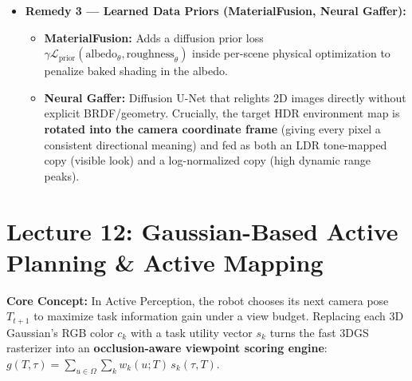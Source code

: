 \documentclass[11pt,a4paper]{article}
\theoremstyle{definition}
\theoremstyle{plain}
\theoremstyle{remark}
\begin{document}
\begin{itemize}
    \begin{itemize}
        \item \textbf{Linearity of Light Transport:} Photons do not interact, so $I(c_A A + c_B B) = c_A I_A + c_B I_B$ (in linear HDR space). Capturing \textbf{One Light at a Time (OLAT)} images $I_k$ builds the light-transport matrix $T = [I_1 \mid \cdots \mid I_K]$; relighting under any new environment $\ell$ is a simple weighted sum $I_{\text{new}} = \sum_k \ell_k I_k$ with \textbf{zero BRDF or geometry estimation} (requires a static subject in a light stage).
    \end{itemize}
    \item \textbf{Remedy 3 --- Learned Data Priors (MaterialFusion, Neural Gaffer):}
    \begin{itemize}
        \item \textbf{MaterialFusion:} Adds a diffusion prior loss $\gamma\mathcal{L}_{\text{prior}}(\text{albedo}_\theta, \text{roughness}_\theta)$ inside per-scene physical optimization to penalize baked shading in the albedo.
        \item \textbf{Neural Gaffer:} Diffusion U-Net that relights 2D images directly without explicit BRDF/geometry. Crucially, the target HDR environment map is \textbf{rotated into the camera coordinate frame} (giving every pixel a consistent directional meaning) and fed as both an LDR tone-mapped copy (visible look) and a log-normalized copy (high dynamic range peaks).
    \end{itemize}
\end{itemize}

\hr
\section*{\textcolor{primary}{Lecture 12: Gaussian-Based Active Planning \& Active Mapping}}
\textbf{Core Concept:} In Active Perception, the robot chooses its next camera pose $T_{t+1}$ to maximize task information gain under a view budget. Replacing each 3D Gaussian's RGB color $c_k$ with a task utility vector $s_k$ turns the fast 3DGS rasterizer into an \textbf{occlusion-aware viewpoint scoring engine}: $g(T,\tau) = \sum_{u\in\Omega}\sum_k w_k(u;T)\,s_k(\tau,T)$.
\end{document}
